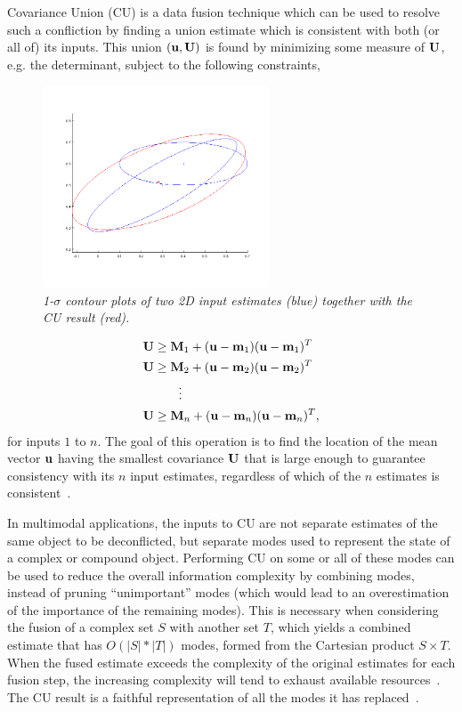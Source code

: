 Covariance Union (CU) is a data fusion technique which can be used to resolve such a confliction by finding a union
estimate which is consistent with both (or all of) its inputs. This union $(\mathbf{u},\mathbf{U})$ is found by minimizing some
measure of $\mathbf{U}$, e.g. the determinant, subject to the following constraints,
\begin{figure}[tbp]
    \centering\includegraphics[width=0.6\textwidth]{figures/cu2d.png}
    \caption{\it 1-$\sigma$ contour plots of two 2D input estimates (blue) together with the CU result (red).}
    \label{fig:cu2d}
\end{figure}
\begin{align}
    \mathbf{U}   &\geq   \mathbf{M}_1 + (\mathbf{u}-\mathbf{m}_1)(\mathbf{u}-\mathbf{m}_1)^T\nonumber\\
    \mathbf{U}   &\geq   \mathbf{M}_2 + (\mathbf{u}-\mathbf{m}_2)(\mathbf{u}-\mathbf{m}_2)^T\nonumber\\
    ~       &\qquad\vdots\nonumber\\
    \mathbf{U}   &\geq   \mathbf{M}_n + (\mathbf{u}-\mathbf{m}_n)(\mathbf{u}-\mathbf{m}_n)^T,\label{eqn:cu}
\end{align}
for inputs $1$ to $n$. The goal of this operation is to find the location of the mean vector $\mathbf{u}$ having the smallest
covariance $\mathbf{U}$ that is large enough to guarantee consistency with its $n$ input estimates, regardless of which of the
$n$ estimates is consistent~\cite{fusion06,uhlmann03}.

In multimodal applications, the inputs to CU are not separate estimates of the same object to be deconflicted, but
separate modes used to represent the state of a complex or compound object. Performing CU on some or all of these modes
can be used to reduce the overall information complexity by combining modes, instead of pruning ``unimportant'' modes
(which would lead to an overestimation of the importance of the remaining modes).
This is necessary when considering the fusion of a complex set $S$ with another set $T$, which yields a combined
estimate that has $O(|S|*|T|)$ modes, formed from the Cartesian product $S\times T$. When the fused estimate exceeds the
complexity of the original estimates for each fusion step, the increasing complexity will tend to exhaust available
resources~\cite{fusion06}. The CU result is a faithful representation of all the modes it has replaced~\cite{uhlmann03}.

